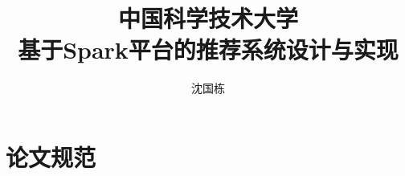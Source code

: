 \documentclass[bachelor]{ustcthesis}
\title{中国科学技术大学\\基于Spark平台的推荐系统设计与实现}
\author{沈国栋}
\begin{document}
\maketitle

%
%
%
\frontmatter

\tableofcontents
\listoffigures
\listoftables
\listofalgorithms  %
% 

\mainmatter












\appendix
\chapter{论文规范}

\backmatter


\end{document}
